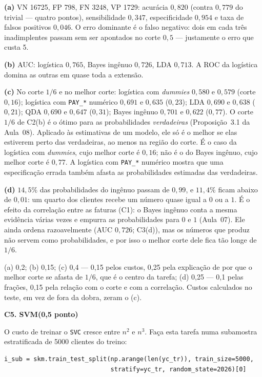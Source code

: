 \documentclass[11pt,a4paper]{article}
\newcommand{\tarefa}[3]{%
  \bigskip\par\noindent
  {\large\bfseries\color{azulufrj}#1. #2}\hfill{\bfseries(#3)}\par
  \nopagebreak\vspace{0.3em}}
\newcommand{\cod}[1]{\texttt{#1}}
\begin{document}
\begin{solucao}
\textbf{(a)} VN 16725, FP 798, FN 3248, VP 1729: acurácia $0{,}820$ (contra $0{,}779$ do
trivial --- quatro pontos), sensibilidade $0{,}347$, especificidade $0{,}954$ e taxa
de falsos positivos $0{,}046$. O erro dominante é o falso negativo: dois em cada três
inadimplentes passam sem ser apontados no corte $0{,}5$ --- justamente o erro que
custa 5.

\textbf{(b)} AUC: logística $0{,}765$, Bayes ingênuo $0{,}726$, LDA $0{,}713$. A ROC da
logística domina as outras em quase toda a extensão.

\textbf{(c)} No corte $1/6$ e no melhor corte: logística com \emph{dummies} $0{,}580$
e $0{,}579$ (corte $0{,}16$); logística com \cod{PAY\_*} numérico $0{,}691$ e $0{,}635$
($0{,}23$); LDA $0{,}690$ e $0{,}638$ ($0{,}21$); QDA $0{,}690$ e $0{,}647$ ($0{,}31$);
Bayes ingênuo $0{,}701$ e $0{,}622$ ($0{,}77$). O corte $1/6$ de C2(b) é o
ótimo para as probabilidades \emph{verdadeiras} (Proposição~3.1 da Aula~08).
Aplicado às estimativas de um modelo, ele só é o melhor se elas estiverem perto das
verdadeiras, ao menos na região do corte. É o caso da logística com \emph{dummies},
cujo melhor corte é $0{,}16$; não é o do Bayes ingênuo, cujo melhor corte é $0{,}77$.
A logística com \cod{PAY\_*} numérico mostra que uma especificação errada também
afasta as probabilidades estimadas das verdadeiras.

\textbf{(d)} $14{,}5\%$ das probabilidades do ingênuo passam de $0{,}99$, e $11{,}4\%$
ficam abaixo de $0{,}01$: um quarto dos clientes recebe um número quase igual a $0$ ou
a $1$. É o efeito da correlação entre as faturas (C1): o Bayes ingênuo conta a
mesma evidência várias vezes e empurra as probabilidades para $0$ e $1$ (Aula~07).
Ele ainda ordena razoavelmente (AUC $0{,}726$; C3(d)), mas os números que produz não
servem como probabilidades, e por isso o melhor corte dele fica tão longe de $1/6$.
\end{solucao}

\begin{criterio}
(a) 0,2; (b) 0,15; (c) 0,4 --- 0,15 pelos custos, 0,25 pela explicação de por que o
melhor corte se afasta de $1/6$, que é o centro da tarefa; (d) 0,25 --- 0,1 pelas
frações, 0,15 pela relação com o corte e com a correlação. Custos calculados no
teste, em vez de fora da dobra, zeram o (c).
\end{criterio}

\tarefa{C5}{SVM}{0,5 ponto}
O custo de treinar o \cod{SVC} cresce entre $n^2$ e $n^3$. Faça esta
tarefa numa subamostra estratificada de 5000 clientes do treino:
\begin{lstlisting}
i_sub = skm.train_test_split(np.arange(len(yc_tr)), train_size=5000,
                             stratify=yc_tr, random_state=2026)[0]
\end{lstlisting}
\end{document}
